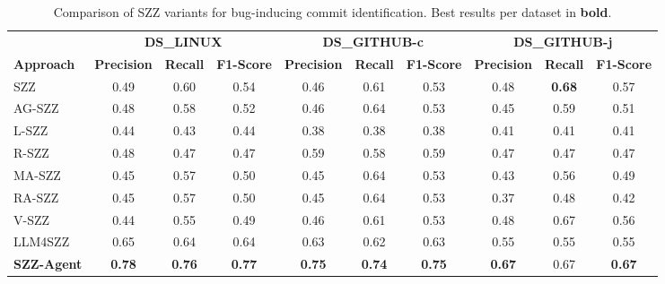 \begin{table}[t]
\centering
\caption{Comparison of SZZ variants for bug-inducing commit identification. Best results per dataset in \textbf{bold}.}
\label{tab:results}
\begin{tabular}{lccccccccc}
\toprule
 & \multicolumn{3}{c}{\textbf{DS\_LINUX}} & \multicolumn{3}{c}{\textbf{DS\_GITHUB-c}} & \multicolumn{3}{c}{\textbf{DS\_GITHUB-j}} \\
\cmidrule(lr){2-4} \cmidrule(lr){5-7} \cmidrule(lr){8-10}
\textbf{Approach} & \textbf{Precision} & \textbf{Recall} & \textbf{F1-Score} & \textbf{Precision} & \textbf{Recall} & \textbf{F1-Score} & \textbf{Precision} & \textbf{Recall} & \textbf{F1-Score} \\
\midrule
SZZ & 0.49 & 0.60 & 0.54 & 0.46 & 0.61 & 0.53 & 0.48 & \textbf{0.68} & 0.57 \\
AG-SZZ & 0.48 & 0.58 & 0.52 & 0.46 & 0.64 & 0.53 & 0.45 & 0.59 & 0.51 \\
L-SZZ & 0.44 & 0.43 & 0.44 & 0.38 & 0.38 & 0.38 & 0.41 & 0.41 & 0.41 \\
R-SZZ & 0.48 & 0.47 & 0.47 & 0.59 & 0.58 & 0.59 & 0.47 & 0.47 & 0.47 \\
MA-SZZ & 0.45 & 0.57 & 0.50 & 0.45 & 0.64 & 0.53 & 0.43 & 0.56 & 0.49 \\
RA-SZZ & 0.45 & 0.57 & 0.50 & 0.45 & 0.64 & 0.53 & 0.37 & 0.48 & 0.42 \\
V-SZZ & 0.44 & 0.55 & 0.49 & 0.46 & 0.61 & 0.53 & 0.48 & 0.67 & 0.56 \\
LLM4SZZ & 0.65 & 0.64 & 0.64 & 0.63 & 0.62 & 0.63 & 0.55 & 0.55 & 0.55 \\
\midrule
\rowcolor{gray!20} \textbf{SZZ-Agent} & \textbf{0.78} & \textbf{0.76} & \textbf{0.77} & \textbf{0.75} & \textbf{0.74} & \textbf{0.75} & \textbf{0.67} & 0.67 & \textbf{0.67} \\
\bottomrule
\end{tabular}
\end{table}
